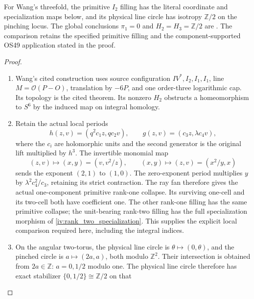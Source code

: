 \begin{theorem}\label{night:P3F.20}
For Wang's threefold, the primitive \(I_2\) filling has the
literal coordinate and specialization maps below, and its physical
line circle has isotropy \(\mathbb Z/2\) on the pinching locus.
The global conclusions \(\pi_1=0\) and
\(H_2=H_3=\mathbb Z/2\) are
\cite[Theorem 1.1, p.~2; proof in Sections 4--6, pp.~9--15]{Wang2026}.
The comparison retains the specified primitive filling and the
component-supported OS49 application stated in the proof.
\end{theorem}
\begin{proof}
\begin{enumerate}[label=\arabic*.]
\item Wang's cited construction uses source configuration
\(IV^*,I_2,I_1,I_1\), line \(M=\mathcal O(P-O)\), translation
by \(-6P\), and one order-three logarithmic cap.  Its topology is
the cited theorem.  Its nonzero \(H_2\) obstructs a homeomorphism
to \(S^6\) by the induced map on integral homology.
\item Retain the actual local periods
\[
h(z,v)=(q^2c_1z,qc_2v),\qquad
g(z,v)=(c_3z,\lambda c_4v),
\]
where the \(c_i\) are holomorphic units and the second generator
is the original lift multiplied by \(h^3\).  The invertible
monomial map
\[
 (z,v)\longmapsto(x,y)=(v,v^2/z),\qquad
 (x,y)\longmapsto(z,v)=(x^2/y,x)
\]
sends the exponent \((2,1)\) to \((1,0)\).  The zero-exponent
period multiplies \(y\) by \(\lambda^2c_4^2/c_3\), retaining
its strict contraction.  The ray fan therefore gives the actual
one-component primitive rank-one collapse.  Its surviving one-cell
and its two-cell both have coefficient one.  The other rank-one
filling has the same primitive collapse; the unit-bearing rank-two
filling has the full specialization morphism of
\cref{iv:rank_two_specialization}.  This supplies the explicit
local comparison required here, including the integral indices.
\item On the angular two-torus, the physical line circle is
\(\theta\mapsto(0,\theta)\), and the pinched circle is
\(a\mapsto(2a,a)\), both modulo \(\mathbb Z^2\).
Their intersection is obtained from \(2a\in\mathbb Z\):
\(a=0,1/2\) modulo one.  The physical line circle therefore has
exact stabilizer \(\{0,1/2\}\cong\mathbb Z/2\) on that

\end{enumerate}
\end{proof}
